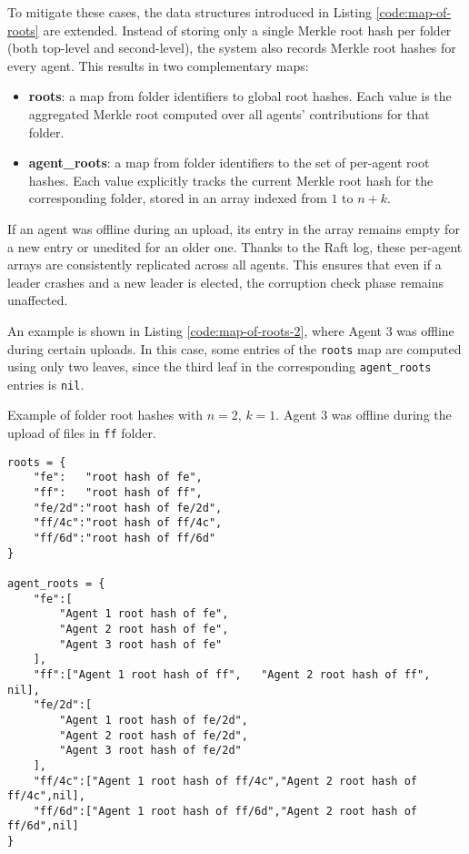 To mitigate these cases, the data structures introduced in Listing \ref{code:map-of-roots} are extended. Instead of storing only a single Merkle root hash per folder (both top-level and second-level), the system also records Merkle root hashes for every agent. This results in two complementary maps:
\begin{itemize}
\item \textbf{roots}: a map from folder identifiers to global root hashes. Each value is the aggregated Merkle root computed over all agents' contributions for that folder.
\item \textbf{agent\_roots}: a map from folder identifiers to the set of per-agent root hashes. Each value explicitly tracks the current Merkle root hash for the corresponding folder, stored in an array indexed from $1$ to $n+k$.
\end{itemize}

If an agent was offline during an upload, its entry in the array remains empty for a new entry or unedited for an older one. Thanks to the Raft log, these per-agent arrays are consistently replicated across all agents. This ensures that even if a leader crashes and a new leader is elected, the corruption check phase remains unaffected.

An example is shown in Listing \ref{code:map-of-roots-2}, where Agent 3 was offline during certain uploads. In this case, some entries of the \texttt{roots} map are computed using only two leaves, since the third leaf in the corresponding \texttt{agent\_roots} entries is \texttt{nil}.

\begin{listing}[H]
\caption{Example of folder root hashes with $n=2$, $k=1$. Agent 3 was offline during the upload of files in \texttt{ff} folder.}
\label{code:map-of-roots-2}
\begin{verbatim}
roots = {
    "fe":   "root hash of fe",
    "ff":   "root hash of ff",
    "fe/2d":"root hash of fe/2d",
    "ff/4c":"root hash of ff/4c",
    "ff/6d":"root hash of ff/6d"
}

agent_roots = {
    "fe":[
        "Agent 1 root hash of fe",
        "Agent 2 root hash of fe",
        "Agent 3 root hash of fe"
    ],
    "ff":["Agent 1 root hash of ff",   "Agent 2 root hash of ff",   nil],
    "fe/2d":[
        "Agent 1 root hash of fe/2d",
        "Agent 2 root hash of fe/2d",
        "Agent 3 root hash of fe/2d"
    ],
    "ff/4c":["Agent 1 root hash of ff/4c","Agent 2 root hash of ff/4c",nil],
    "ff/6d":["Agent 1 root hash of ff/6d","Agent 2 root hash of ff/6d",nil]
}
\end{verbatim}
\end{listing}

